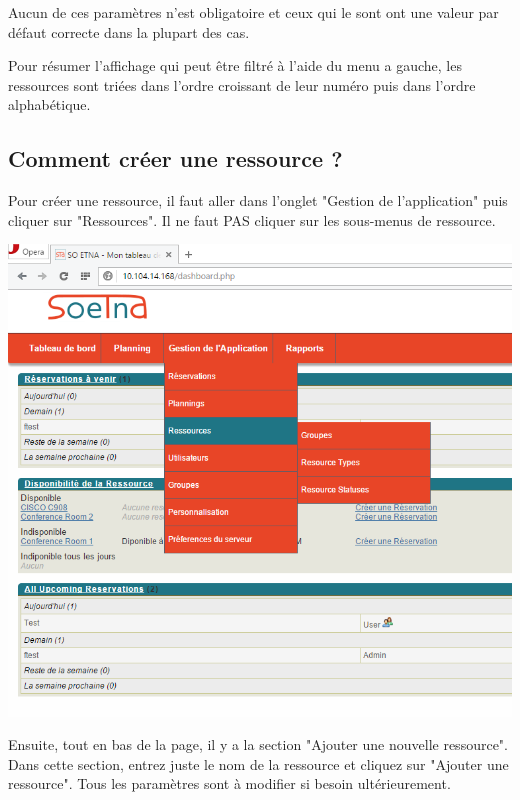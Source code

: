 \documentclass[a4paper,11pt]{article}
\begin{document}
\vspace{1 cm}

Aucun de ces paramètres n'est obligatoire et ceux qui le sont ont une valeur par défaut correcte dans la plupart des cas.

Pour résumer l'affichage qui peut être filtré à l'aide du menu a gauche, les ressources sont triées dans
l'ordre croissant de leur numéro puis dans l'ordre alphabétique.

\newpage

\subsection{Comment créer une ressource ?}

Pour créer une ressource, il faut aller dans l'onglet "Gestion de l'application" puis cliquer sur "Ressources". Il ne faut PAS cliquer sur les sous-menus
de ressource.

\vspace{1 cm}

\includegraphics[width=15cm]{./res1.PNG}

\newpage

Ensuite, tout en bas de la page, il y a la section "Ajouter une nouvelle ressource". Dans cette section, entrez juste le nom de la ressource 
et cliquez sur "Ajouter une ressource". Tous les paramètres sont à modifier si besoin ultérieurement.
\end{document}

